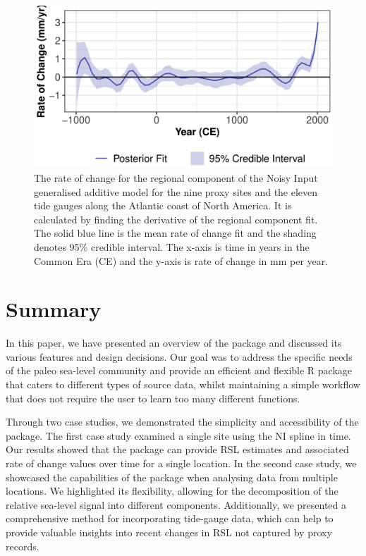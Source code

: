 \begin{figure}

{\centering \includegraphics[width=0.8\linewidth]{figures/regrateplot-1} 

}

\caption{The rate of change for the regional component of the Noisy Input generalised additive model for the nine proxy sites and the eleven tide gauges along the Atlantic coast of North America. It is calculated by finding the derivative of the regional component fit. The solid blue line is the mean rate of change fit and the shading denotes 95\% credible interval. The x-axis is time in years in the Common Era (CE) and the y-axis is rate of change in mm per year.}\label{fig:regrateplotload}
\end{figure}

\normalsize

\hypertarget{summmary}{%
\section{Summary}\label{summmary}}

In this paper, we have presented an overview of the  package and discussed its various features and design decisions. Our goal was to address the specific needs of the paleo sea-level community and provide an efficient and flexible R package that caters to different types of source data, whilst maintaining a simple workflow that does not require the user to learn too many different functions.

Through two case studies, we demonstrated the simplicity and accessibility of the package. The first case study examined a single site using the NI spline in time. Our results showed that the  package can provide RSL estimates and associated rate of change values over time for a single location. In the second case study, we showcased the capabilities of the  package when analysing data from multiple locations. We highlighted its flexibility, allowing for the decomposition of the relative sea-level signal into different components. Additionally, we presented a comprehensive method for incorporating tide-gauge data, which can help to provide valuable insights into recent changes in RSL not captured by proxy records.


